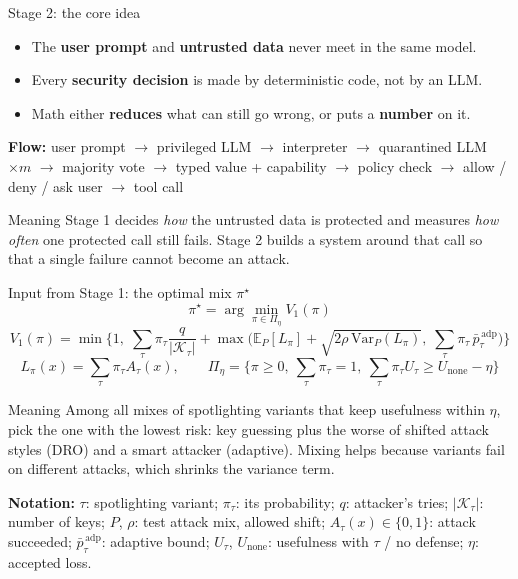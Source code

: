 \documentclass[aspectratio=169,11pt]{beamer}
\providecommand{\notation}[1]{\par\vfill{\scriptsize\textcolor{gray!80!black}{\textbf{Notation:} #1}}}
\begin{document}
\begin{frame}{Stage 2: the core idea}
  \begin{itemize}
    \item The \textbf{user prompt} and \textbf{untrusted data} never meet in the same model.
    \item Every \textbf{security decision} is made by deterministic code, not by an LLM.
    \item Math either \textbf{reduces} what can still go wrong, or puts a \textbf{number} on it.
  \end{itemize}
  \vspace{0.5em}
  \small
  \textbf{Flow:} user prompt $\to$ privileged LLM $\to$ interpreter $\to$ quarantined LLM $\times m$
  $\to$ majority vote $\to$ typed value + capability $\to$ policy check
  $\to$ allow / deny / ask user $\to$ tool call
  \begin{block}{Meaning}
    Stage 1 decides \emph{how} the untrusted data is protected and measures \emph{how often} one protected call still fails. Stage 2 builds a system around that call so that a single failure cannot become an attack.
  \end{block}
\end{frame}

\begin{frame}{Input from Stage 1: the optimal mix $\pi^\star$}
  \small
  \[
    \pi^\star = \arg\min_{\pi \in \Pi_\eta} V_1(\pi)
  \]
  \[
    V_1(\pi) = \min\Big\{1,\; \sum_\tau \pi_\tau \frac{q}{|\mathcal{K}_\tau|}
    + \max\Big(\mathbb{E}_P[L_\pi] + \sqrt{2\rho\,\mathrm{Var}_P(L_\pi)},\;
    \sum_\tau \pi_\tau\, \bar p^{\,\mathrm{adp}}_\tau\Big)\Big\}
  \]
  \[
    L_\pi(x) = \sum_\tau \pi_\tau A_\tau(x), \qquad
    \Pi_\eta = \Big\{\pi \ge 0,\ \textstyle\sum_\tau \pi_\tau = 1,\
    \sum_\tau \pi_\tau U_\tau \ge U_{\mathrm{none}} - \eta\Big\}
  \]
  \begin{block}{Meaning}
    Among all mixes of spotlighting variants that keep usefulness within $\eta$, pick the one with the lowest risk: key guessing plus the worse of shifted attack styles (DRO) and a smart attacker (adaptive). Mixing helps because variants fail on different attacks, which shrinks the variance term.
  \end{block}
  \notation{$\tau$: spotlighting variant; $\pi_\tau$: its probability; $q$: attacker's tries; $|\mathcal{K}_\tau|$: number of keys; $P$, $\rho$: test attack mix, allowed shift; $A_\tau(x)\in\{0,1\}$: attack succeeded; $\bar p^{\,\mathrm{adp}}_\tau$: adaptive bound; $U_\tau$, $U_{\mathrm{none}}$: usefulness with $\tau$ / no defense; $\eta$: accepted loss.}
\end{frame}
\end{document}
